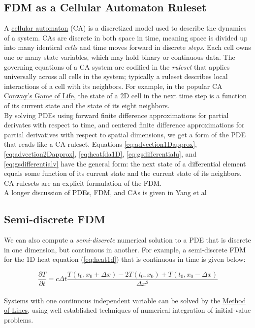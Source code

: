 {  \subsection{FDM as a Cellular Automaton Ruleset}

A \href{https://en.wikipedia.org/wiki/Cellular_automaton}{cellular automaton} (CA) is a discretized model used to describe the dynamics of a system.  CAs are discrete in both space in time, meaning space is divided up into many identical \textit{cells} and time moves forward in discrete \textit{steps}.  Each cell owns one or many state variables, which may hold binary or continuous data.  The governing equations of a CA system are codified in the \textit{ruleset} that applies universally across all cells in the system; typically a ruleset describes local interactions of a cell with its neighbors.  For example, in the popular CA \href{https://en.wikipedia.org/wiki/Conway's_Game_of_Life}{Conway's Game of Life}, the state of a 2D cell in the next time step is a function of its current state and the state of its eight neighbors.\\

By solving PDEs using forward finite difference approximations for partial derivates with respect to time, and centered finite difference approximations for partial derivatives with respect to spatial dimensions, we get a form of the PDE that reads like a CA ruleset.  Equations \ref{eq:advection1Dapprox}, \ref{eq:advection2Dapprox}, \ref{eq:heatfda1D}, \ref{eq:gsdifferentialu}, and \ref{eq:gsdifferentialv} have the general form: the next state of a differential element equals some function of its current state and the current state of its neighbors. CA rulesets are an explicit formulation of the FDM.\\

A longer discussion of PDEs, FDM, and CAs is given in Yang et al\cite{Yang2010}

\subsection{Semi-discrete FDM}

We can also compute a \textit{semi-discrete} numerical solution to a PDE that is discrete in one dimension, but continuous in another.  For example, a semi-discrete FDM for the 1D heat equation (\ref{eq:heat1d}) that is continuous in time is given below:

 \begin{equation}
  \frac{\partial T}{\partial t} = c\Delta  t\frac{T(t_{0},x_{0} + \Delta  x) - 2T(t_{0},x_{0}) + T(t_{0},x_{0} -\Delta  x)}{\Delta  x^{2}}
  \end{equation}
  \\
  Systems with one continuous independent variable can be solved by the \href{https://en.wikipedia.org/wiki/Method_of_lines}{Method of Lines}, using well established techniques of numerical integration of initial-value problems.
  
}
